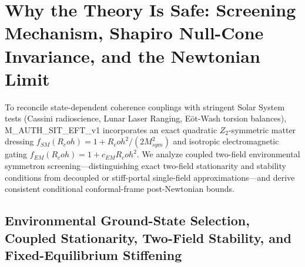 \documentclass[american,11pt,letterpaper]{article}
\newcommand{\Rcoh}{R_{\mathrm{coh}}}
\def\mathbb#1{#1}%
\def\mathrm#1{#1}%
\def\texttt#1{#1}%
\def\Rcoh{R_coh}%
\begin{document}
\section{Why the Theory Is Safe: Screening Mechanism, Shapiro Null-Cone Invariance, and the Newtonian Limit}
\label{sec:screening-mechanism}

To reconcile state-dependent coherence couplings with stringent Solar System tests (Cassini radioscience, Lunar Laser Ranging, E\"ot-Wash torsion balances), \texttt{M\_AUTH\_SIT\_EFT\_v1} incorporates an exact quadratic $\mathbb{Z}_2$-symmetric matter dressing $f_{\mathrm{SM}}(\Rcoh) = 1 + \Rcoh^2/(2 M_{\mathrm{sym}}^2)$ and isotropic electromagnetic gating $f_{\mathrm{EM}}(\Rcoh) = 1 + c_{\mathrm{EM}}\Rcoh^2$. We analyze coupled two-field environmental symmetron screening---distinguishing exact two-field stationarity and stability conditions from decoupled or stiff-portal single-field approximations---and derive consistent conditional conformal-frame post-Newtonian bounds.

\subsection{Environmental Ground-State Selection, Coupled Stationarity, Two-Field Stability, and Fixed-Equilibrium Stiffening}
\end{document}
